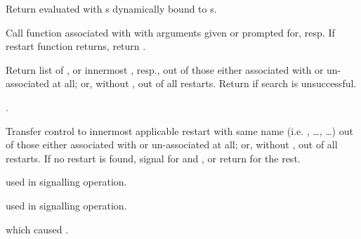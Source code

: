 \begin{LIST}{1cm}
  {
  Return  evaluated with s 
  dynamically bound to s.
  }

  {
  Call function associated with  with arguments given or
  prompted for, resp. If restart function returns, return .
  }

  {
  Return list of , or innermost 
  , resp., out of those either associated
  with  or un-associated at all; or, without
  , out of all restarts. Return \retval{\NIL} if search
  is unsuccessful.
  }

  {
  .
  }

  {
  Transfer control to innermost applicable restart with same name
  (i.e. , \ldots,  \ldots) out of those either associated
  with  or un-associated at all; or, without
  , out of all restarts. If no restart is found,
  signal  for  and ,
  or return \retval{\NIL} for the rest.
  }

  {
   used in signalling operation.
  }

  {
   used in signalling operation.
  }

  {
   which caused .
  }


\end{LIST}
